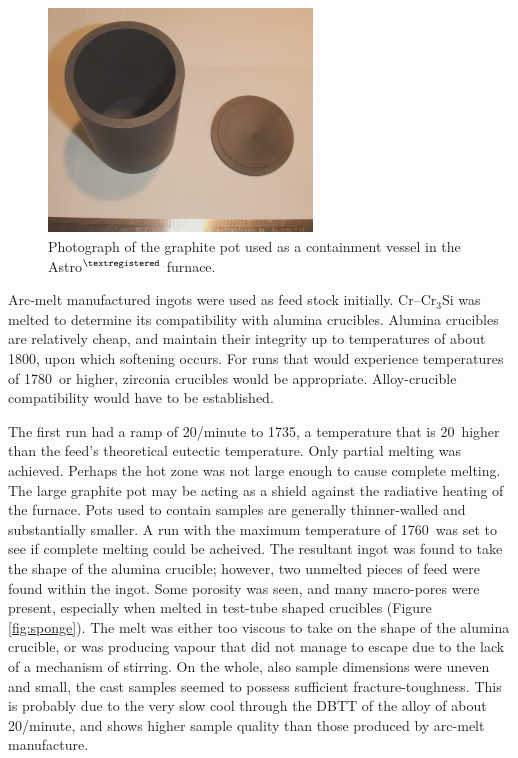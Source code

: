 %
\begin{figure}[H]
\begin{center}
\includegraphics[width=7cm]{cleanpot}
\caption{Photograph of the graphite pot used as a containment vessel in the Astro$^{\textregistered}$ furnace.}
\label{fig:cleanpot}
\end{center}
\end{figure}
%

Arc-melt manufactured ingots were used as feed stock initially.  Cr--Cr$_3$Si was melted to determine its compatibility with alumina crucibles.  Alumina crucibles are relatively cheap, and maintain their integrity up to temperatures of about 1800\celsius, upon which softening occurs.  For runs that would experience temperatures of 1780\celsius\ or higher, zirconia crucibles would be appropriate.  Alloy-crucible compatibility would have to be established. 

The first run had a ramp of 20\celsius/minute to 1735\celsius, a temperature that is 20\celsius\ higher than the feed's theoretical eutectic temperature.  Only partial melting was achieved.  Perhaps the hot zone was not large enough to cause complete melting.  The large graphite pot may be acting as a shield against the radiative heating of the furnace.  Pots used to contain samples are generally thinner-walled and substantially smaller.  A run with the maximum temperature of 1760\celsius\ was set to see if complete melting could be acheived.  The resultant ingot was found to take the shape of the alumina crucible; however, two unmelted pieces of feed were found within the ingot.  Some porosity was seen, and many macro-pores were present, especially when melted in test-tube shaped crucibles (Figure \ref{fig:sponge}).  The melt was either too viscous to take on the shape of the alumina crucible, or was producing vapour that did not manage to escape due to the lack of a mechanism of stirring.  On the whole, also sample dimensions were uneven and small, the cast samples seemed to possess sufficient fracture-toughness.  This is probably due to the very slow cool through the DBTT of the alloy of about 20\celsius/minute, and shows higher sample quality than those produced by arc-melt manufacture.

